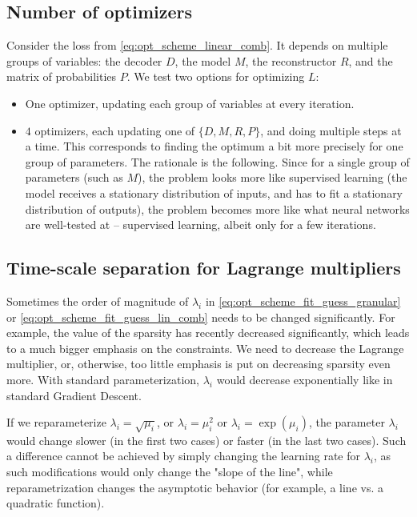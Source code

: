 \documentclass[a4paper,11pt,oneside]{report}
\begin{document}
\subsection{Number of optimizers}
Consider the loss from \autoref{eq:opt_scheme_linear_comb}. It depends on multiple groups of variables: the decoder $D$, the model $M$, the reconstructor $R$, and the matrix of probabilities $P$. We test two options for optimizing $L$:
\begin{itemize}
    \item One optimizer, updating each group of variables at every iteration.
    \item $4$ optimizers, each updating one of $\{D,M,R,P\}$, and doing multiple steps at a time. This corresponds to finding the optimum a bit more precisely for one group of parameters. The rationale is the following. Since for a single group of parameters (such as $M$), the problem looks more like supervised learning (the model receives a stationary distribution of inputs, and has to fit a stationary distribution of outputs), the problem becomes more like what neural networks are well-tested at -- supervised learning, albeit only for a few iterations.
\end{itemize}

\subsection{Time-scale separation for Lagrange multipliers}
Sometimes the order of magnitude of $\lambda_i$ in \autoref{eq:opt_scheme_fit_guess_granular} or \autoref{eq:opt_scheme_fit_guess_lin_comb} needs to be changed significantly. For example, the value of the sparsity has recently decreased significantly, which leads to a much bigger emphasis on the constraints. We need to decrease the Lagrange multiplier, or, otherwise, too little emphasis is put on decreasing sparsity even more. With standard parameterization, $\lambda_i$ would decrease exponentially like in standard Gradient Descent.

If we reparameterize $\lambda_i=\sqrt{\mu_i}$, or $\lambda_i=\mu_i^2$ or $\lambda_i=\exp(\mu_i)$, the parameter $\lambda_i$ would change slower (in the first two cases) or faster (in the last two cases). Such a difference cannot be achieved by simply changing the learning rate for $\lambda_i$, as such modifications would only change the "slope of the line", while reparametrization changes the asymptotic behavior (for example, a line vs. a quadratic function).
\end{document}
